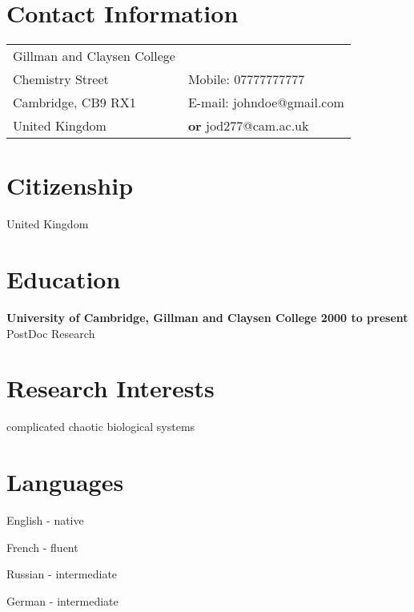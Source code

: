 




\section{Contact Information}
%
%
%
\newlength{\rcollength}\setlength{\rcollength}{1.95in}%
%
\begin{tabular}[t]{@{}p{\textwidth-\rcollength-.3in}p{\rcollength}}
  Gillman and Claysen College       & \\
  Chemistry Street              & \hfill Mobile: 07777777777 \\
  Cambridge, CB9 RX1            & \hfill E-mail: johndoe@gmail.com \\
  United Kingdom                & \hfill {\bf or} jod277@cam.ac.uk \\
\end{tabular}

\section{Citizenship}
United Kingdom

\section{Education}
\textbf{University of Cambridge, Gillman and Claysen College
\hfill 2000 to present}\\
PostDoc Research

\section{Research Interests}
\begin{innerlist}
    \item complicated chaotic biological systems
\end{innerlist}

\section{Languages}
\begin{loneinnerlist}
  \item English - native
  \item French - fluent
  \item Russian - intermediate
  \item German - intermediate
\end{loneinnerlist}

